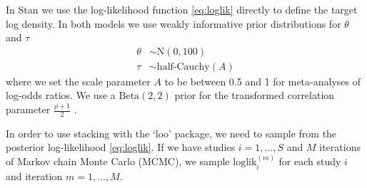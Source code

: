 \documentclass[12pt]{article}   	%
\numberwithin{equation}{section}
\begin{document}
In Stan we use the log-likelihood function \eqref{eq:loglik} directly to define the target log density. In both models we use weakly informative prior distributions for $\theta$ and $\tau$
\begin{align}
\theta &\sim \mbox{N}(0, 100) \label{eq:theta} \\
\tau &\sim \mbox{half-Cauchy}(A) \label{eq:tau}
\end{align}
where we set the scale parameter $A$ to be between 0.5 and 1 for meta-analyses of log-odds ratios. We use a $\mbox{Beta}(2, 2)$ prior for the transformed correlation parameter $\frac{\rho + 1}{2}$ \citep{gelman1995bda}.
 
In order to use stacking with the `loo' package, we need to sample from the posterior log-likelihood \eqref{eq:loglik}. If we have studies $i = 1, \dots, S$ and $M$ iterations of Markov chain Monte Carlo (MCMC), we sample $\mbox{loglik}_i^{(m)}$ for each study $i$ and iteration $m = 1, \dots, M$.



\end{document}
